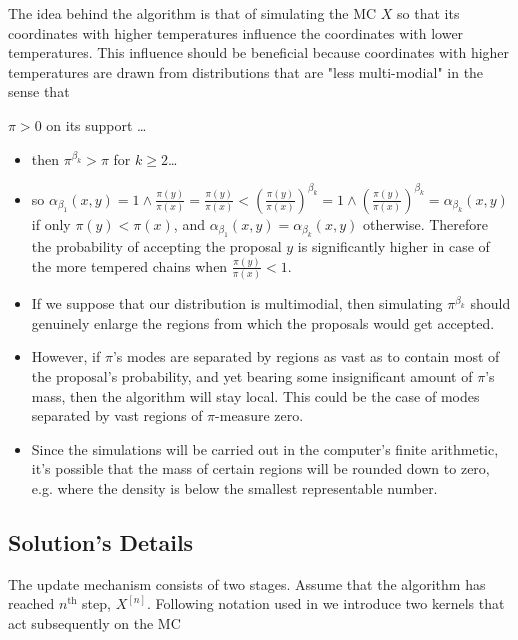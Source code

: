 The idea behind the algorithm is that of simulating the MC $X$ so that its coordinates with higher temperatures influence the coordinates with lower temperatures. This influence should be beneficial because coordinates with higher temperatures are drawn from distributions that are "less multi-modial" in the sense that

\begin{assumptions}[resume]
	\item $\pi > 0$ on its support \dots
\end{assumptions}
	

\begin{itemize}	
	\item then $\pi^{\beta_k} > \pi$ for $k \geq 2$\dots
	\item so $\alpha_{\beta_1}(x,y) = 1 \wedge \frac{\pi(y)}{\pi(x)} = \frac{\pi(y)}{\pi(x)} <  (\frac{\pi(y)}{\pi(x)})^{\beta_k} = 1 \wedge (\frac{\pi(y)}{\pi(x)})^{\beta_k} = \alpha_{\beta_k}(x,y)$ if only $\pi(y) < \pi(x)$, and $\alpha_{\beta_1}(x,y) = \alpha_{\beta_k}(x,y)$ otherwise. Therefore the probability of accepting the proposal $y$ is significantly higher in case of the more tempered chains when $\frac{\pi(y)}{\pi(x)} < 1$.
	\item If we suppose that our distribution is multimodial, then simulating $\pi^{\beta_k}$ should genuinely enlarge the regions from which the proposals would get accepted. 
	\item However, if $\pi$'s modes are separated by regions as vast as to contain most of the proposal's probability, and yet bearing some insignificant amount of $\pi$'s mass, then the algorithm will stay local. This could be the case of modes separated by vast regions of $\pi$-measure zero. 
	\item Since the simulations will be carried out in the computer's finite arithmetic, it's possible that the mass of certain regions will be rounded down to zero, e.g. where the density is below the smallest representable number.  
\end{itemize}  




	\subsection*{Solution's Details}

The update mechanism consists of two stages. Assume that the algorithm has reached $n^\text{th}$ step, $X^{[n]}$. Following notation used in \citet*{BM1} we introduce two kernels that act subsequently on the MC

